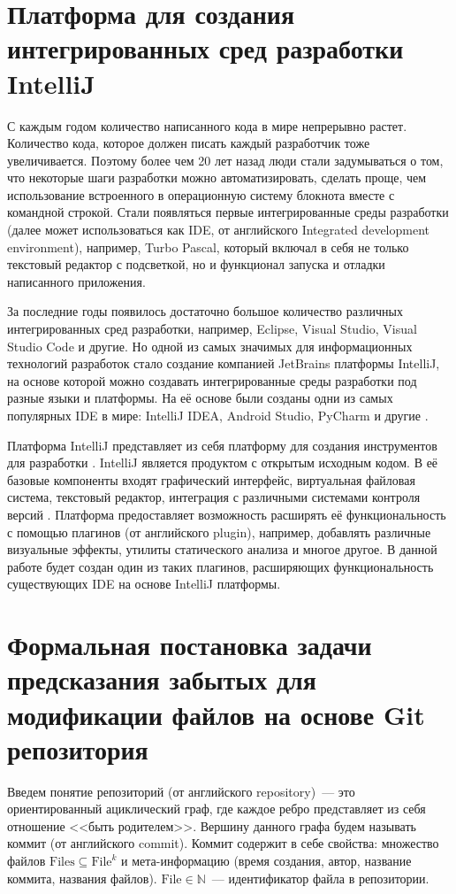 \section{Платформа для создания интегрированных сред разработки IntelliJ}\label{chapter1-intellij}
С каждым годом количество написанного кода в мире непрерывно растет. Количество кода, которое должен писать каждый разработчик тоже увеличивается. Поэтому более чем 20 лет назад люди стали задумываться о том, что некоторые шаги разработки можно автоматизировать, сделать проще, чем использование встроенного в операционную систему блокнота вместе с командной строкой. Стали появляться первые интегрированные среды разработки (далее может использоваться как IDE, от английского Integrated development environment), например, Turbo Pascal, который включал в себя не только текстовый редактор с подсветкой, но и функционал запуска и отладки написанного приложения.

За последние годы появилось достаточно большое количество различных интегрированных сред разработки, например, Eclipse, Visual Studio, Visual Studio Code и другие. Но одной из самых значимых для информационных технологий разработок стало создание компанией JetBrains платформы IntelliJ, на основе которой можно создавать интегрированные среды разработки под разные языки и платформы. На её основе были созданы одни из самых популярных IDE в мире: IntelliJ IDEA, Android Studio, PyCharm и другие \cite{top-ide}.

Платформа IntelliJ представляет из себя платформу для создания инструментов для разработки \cite{intellij-top}. IntelliJ является продуктом с открытым исходным кодом. В её базовые компоненты входят графический интерфейс, виртуальная файловая система, текстовый редактор, интеграция с различными системами контроля версий \cite{intellij-top}. Платформа предоставляет возможность расширять её функциональность с помощью плагинов (от английского plugin), например, добавлять различные визуальные эффекты, утилиты статического анализа и многое другое. В данной работе будет создан один из таких плагинов, расширяющих функциональность существующих IDE на основе IntelliJ платформы.


\section{Формальная постановка задачи предсказания забытых для модификации файлов на основе Git репозитория}\label{requirements}
Введем понятие репозиторий (от английского repository)~--- это ориентированный ациклический граф, где каждое ребро представляет из себя отношение <<быть родителем>>. Вершину данного графа будем называть коммит (от английского commit). Коммит содержит в себе свойства: множество файлов $\text{Files} \subseteq \text{File}^k$ и мета-информацию (время создания, автор, название коммита, названия файлов). $\text{File} \in \mathbb{N}$~--- идентификатор файла в репозитории.\\
